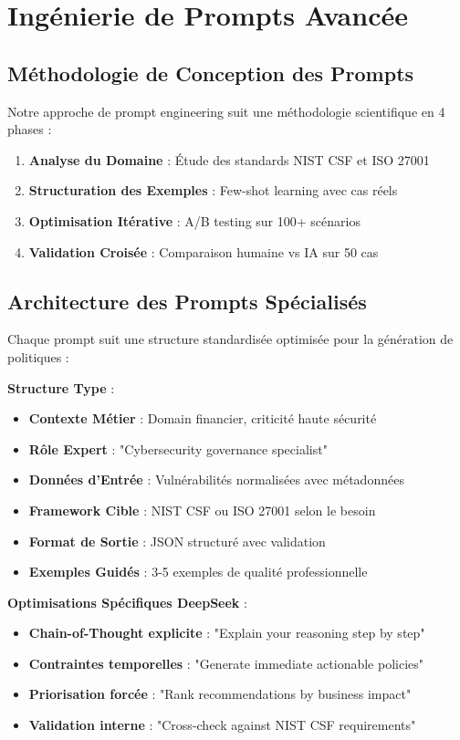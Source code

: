 \documentclass[12pt,a4paper]{report}
\begin{document}
\section{Ingénierie de Prompts Avancée}

\subsection{Méthodologie de Conception des Prompts}

Notre approche de prompt engineering suit une méthodologie scientifique en 4 phases :

\begin{enumerate}
    \item \textbf{Analyse du Domaine} : Étude des standards NIST CSF et ISO 27001
    \item \textbf{Structuration des Exemples} : Few-shot learning avec cas réels
    \item \textbf{Optimisation Itérative} : A/B testing sur 100+ scénarios
    \item \textbf{Validation Croisée} : Comparaison humaine vs IA sur 50 cas
\end{enumerate}

\subsection{Architecture des Prompts Spécialisés}

Chaque prompt suit une structure standardisée optimisée pour la génération de politiques :

\textbf{Structure Type} :
\begin{itemize}
    \item \textbf{Contexte Métier} : Domain financier, criticité haute sécurité
    \item \textbf{Rôle Expert} : "Cybersecurity governance specialist"
    \item \textbf{Données d'Entrée} : Vulnérabilités normalisées avec métadonnées
    \item \textbf{Framework Cible} : NIST CSF ou ISO 27001 selon le besoin
    \item \textbf{Format de Sortie} : JSON structuré avec validation
    \item \textbf{Exemples Guidés} : 3-5 exemples de qualité professionnelle
\end{itemize}

\textbf{Optimisations Spécifiques DeepSeek} :
\begin{itemize}
    \item \textbf{Chain-of-Thought explicite} : "Explain your reasoning step by step"
    \item \textbf{Contraintes temporelles} : "Generate immediate actionable policies"
    \item \textbf{Priorisation forcée} : "Rank recommendations by business impact"
    \item \textbf{Validation interne} : "Cross-check against NIST CSF requirements"
\end{itemize}
\end{document}
